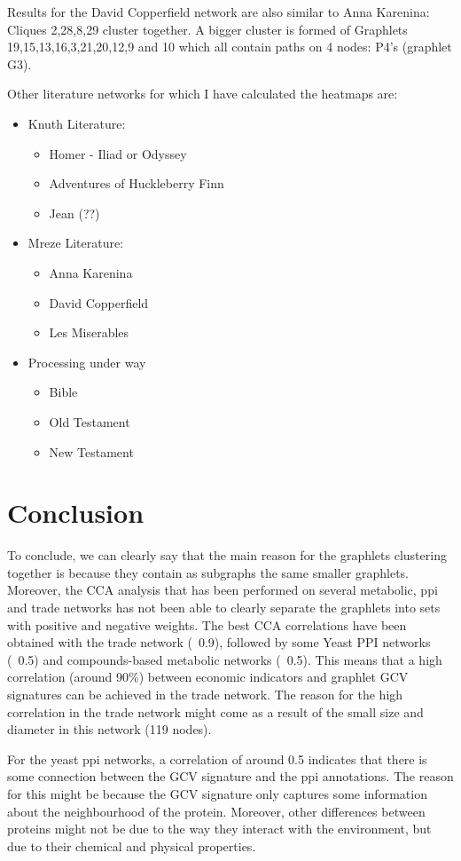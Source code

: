 \documentclass[11pt,a4paper,oneside]{report}
\begin{document}
Results for the David Copperfield network are also similar to Anna Karenina: Cliques 2,28,8,29 cluster together. A bigger cluster is formed of Graphlets 19,15,13,16,3,21,20,12,9 and 10 which all contain paths on 4 nodes: P4's (graphlet G3). 


Other literature networks for which I have calculated the heatmaps are:
\begin{itemize}
 \item Knuth Literature:
 \begin{itemize}
    \item Homer - Iliad or Odyssey
    \item Adventures of Huckleberry Finn
    \item Jean (??)
  \end{itemize}
 \item Mreze Literature:
 \begin{itemize}
    \item Anna Karenina
    \item David Copperfield
    \item Les Miserables
  \end{itemize}
  \item Processing under way
  \begin{itemize}
  \item Bible
    \item Old Testament
    \item New Testament
  \end{itemize}
  \end{itemize}

\section*{Conclusion}  
  To conclude, we can clearly say that the main reason for the graphlets clustering together is because they contain as subgraphs the same smaller graphlets. Moreover, the CCA analysis that has been performed on several metabolic, ppi and trade networks has not been able to clearly separate the graphlets into sets with positive and negative weights. The best CCA correlations have been obtained with the trade network (~0.9), followed by some Yeast PPI networks (~0.5) and compounds-based metabolic networks (~0.5). This means that a high correlation (around 90\%) between economic indicators and graphlet GCV signatures can be achieved in the trade network. The reason for the high correlation in the trade network might come as a result of the small size and diameter in this network (119 nodes). 
  
  For the yeast ppi networks, a correlation of around 0.5 indicates that there is some connection between the GCV signature and the 
  ppi annotations. The reason for this might be because the GCV signature only captures some information about the neighbourhood of the protein. Moreover, other differences between proteins might not be due to the way they interact with the environment, but due to their chemical and physical properties.
  
\end{document}
